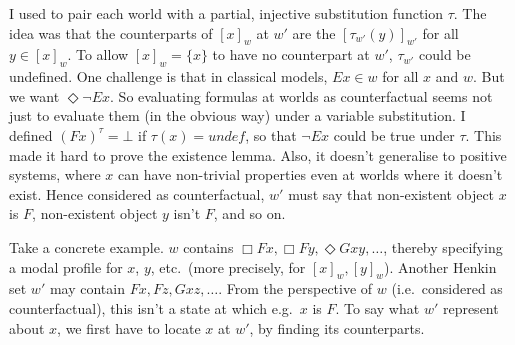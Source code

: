 \documentclass[11pt]{woarticle}
\theoremstyle{break}
\theoremstyle{nonumberplain}
\newcommand{\1}{\;\,|\;\,}
\newcommand{\falsum}{\bot}
\begin{document}
{  I used to pair each world with a partial, injective substitution function
  $\tau$. The idea was that the counterparts of $[x]_w$ at $w'$ are the
  $[\tau_{w'}(y)]_{w'}$ for all $y \in [x]_w$. To allow $[x]_w = \{x \}$ to have
  no counterpart at $w'$, $\tau_{w'}$ could be undefined. One challenge is that
  in classical models, $Ex \in w$ for all $x$ and $w$. But we want
  $\Diamond \neg Ex$. So evaluating formulas at worlds as counterfactual seems
  not just to evaluate them (in the obvious way) under a variable substitution.
  I defined $(Fx)^\tau = \falsum$ if $\tau(x) = undef$, so that $\neg Ex$ could
  be true under $\tau$. This made it hard to prove the existence lemma. Also, it
  doesn't generalise to positive systems, where $x$ can have non-trivial
  properties even at worlds where it doesn't exist. Hence considered as
  counterfactual, $w'$ must say that non-existent object $x$ is $F$,
  non-existent object $y$ isn't $F$, and so on.

  \bigskip

  Take a concrete example. $w$ contains
  $\Box Fx, \Box Fy, \Diamond Gxy, \ldots$, thereby specifying a modal profile
  for $x$, $y$, etc.\ (more precisely, for $[x]_w, [y]_w$). Another Henkin set
  $w'$ may contain $Fx, Fz, Gxz, \ldots$. From the perspective of $w$ (i.e.\
  considered as counterfactual), this isn't a state at which e.g.\ $x$ is $F$.
  To say what $w'$ represent about $x$, we first have to locate $x$ at $w'$, by
  finding its counterparts.

}
\end{document}
